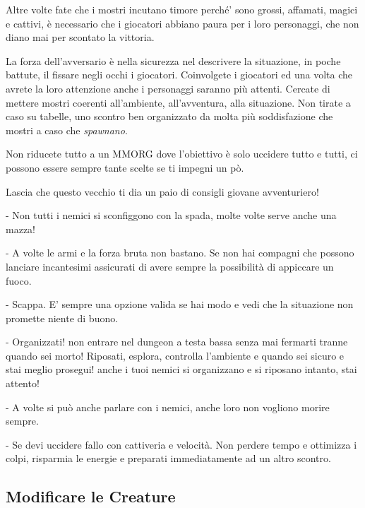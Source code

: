 \begin{multicols}{2}
Altre volte fate che i mostri incutano timore perché' sono grossi, affamati, magici e cattivi, è necessario che i giocatori abbiano paura per i loro personaggi, che non diano mai per scontato la vittoria.

La forza dell'avversario è nella sicurezza nel descrivere la situazione, in poche battute, il fissare negli occhi i giocatori. Coinvolgete i giocatori ed una volta che avrete la loro attenzione anche i personaggi saranno più attenti. Cercate di mettere mostri coerenti all'ambiente, all'avventura, alla situazione. Non tirate a caso su tabelle, uno scontro ben organizzato da molta più soddisfazione che mostri a caso che \emph{spawnano}.

Non riducete tutto a un MMORG dove l'obiettivo è solo uccidere tutto e tutti, ci possono essere sempre tante scelte se ti impegni un pò.

\begin{changemargin}{0.3cm}{0.3cm}\begin{tcolorbox}[title = Affrontare i mostri]
{
Lascia che questo vecchio ti dia un paio di consigli giovane avventuriero!

- Non tutti i nemici si sconfiggono con la spada, molte volte serve anche una mazza!

- A volte le armi e la forza bruta non bastano. Se non hai compagni che possono lanciare incantesimi assicurati di avere sempre la possibilità di appiccare un fuoco.

- Scappa. E' sempre una opzione valida se hai modo e vedi che la situazione non promette niente di buono.

- Organizzati! non entrare nel dungeon a testa bassa senza mai fermarti tranne quando sei morto! Riposati, esplora, controlla l'ambiente e quando sei sicuro e stai meglio prosegui! anche i tuoi nemici si organizzano e si riposano intanto, stai attento!

- A volte si può anche parlare con i nemici, anche loro non vogliono morire sempre.

- Se devi uccidere fallo con cattiveria e velocità. Non perdere tempo e ottimizza i colpi, risparmia le energie e preparati immediatamente ad un altro scontro.

}\end{tcolorbox}\end{changemargin}

\subsection{Modificare le Creature}


\end{multicols}
